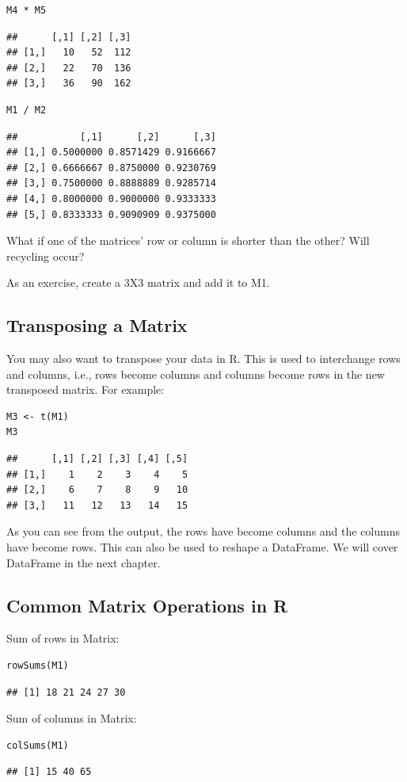 \documentclass[12pt]{book}
\begin{document}
\begin{verbatim}
M4 * M5
\end{verbatim}
\begin{verbatim}
##      [,1] [,2] [,3]
## [1,]   10   52  112
## [2,]   22   70  136
## [3,]   36   90  162
\end{verbatim}
\begin{verbatim}
M1 / M2
\end{verbatim}
\begin{verbatim}
##           [,1]      [,2]      [,3]
## [1,] 0.5000000 0.8571429 0.9166667
## [2,] 0.6666667 0.8750000 0.9230769
## [3,] 0.7500000 0.8888889 0.9285714
## [4,] 0.8000000 0.9000000 0.9333333
## [5,] 0.8333333 0.9090909 0.9375000
\end{verbatim}
What if one of the matrices' row or column is shorter than the other? Will recycling occur?

As an exercise, create a 3X3 matrix and add it to M1.

\subsection{Transposing a Matrix}
You may also want to transpose your data in R. This is used to interchange rows and columns, i.e., rows become columns and columns become rows in the new transposed matrix. For example:

\begin{verbatim}
M3 <- t(M1)
M3
\end{verbatim}
\begin{verbatim}
##      [,1] [,2] [,3] [,4] [,5]
## [1,]    1    2    3    4    5
## [2,]    6    7    8    9   10
## [3,]   11   12   13   14   15
\end{verbatim}
As you can see from the output, the rows have become columns and the columns have become rows. This can also be used to reshape a DataFrame. We will cover DataFrame in the next chapter.

\subsection{Common Matrix Operations in R}
Sum of rows in Matrix:
\begin{verbatim}
rowSums(M1)
\end{verbatim}
\begin{verbatim}
## [1] 18 21 24 27 30
\end{verbatim}

Sum of columns in Matrix:
\begin{verbatim}
colSums(M1)
\end{verbatim}
\begin{verbatim}
## [1] 15 40 65
\end{verbatim}
\end{document}
